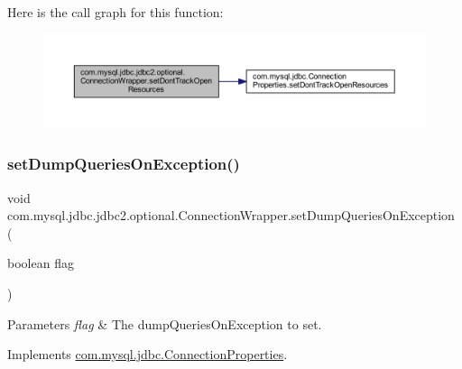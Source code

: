 Here is the call graph for this function\+:
\nopagebreak
\begin{figure}[H]
\begin{center}
\leavevmode
\includegraphics[width=350pt]{classcom_1_1mysql_1_1jdbc_1_1jdbc2_1_1optional_1_1_connection_wrapper_abae4382f9155415413562a3593b61a5d_cgraph}
\end{center}
\end{figure}
\mbox{\label{classcom_1_1mysql_1_1jdbc_1_1jdbc2_1_1optional_1_1_connection_wrapper_a0e4c6f477c15bd82e03a4376fbef7124}} 
\subsubsection{\texorpdfstring{set\+Dump\+Queries\+On\+Exception()}{setDumpQueriesOnException()}}
{\footnotesize\ttfamily void com.\+mysql.\+jdbc.\+jdbc2.\+optional.\+Connection\+Wrapper.\+set\+Dump\+Queries\+On\+Exception (\begin{DoxyParamCaption}\item[{boolean}]{flag }\end{DoxyParamCaption})}


\begin{DoxyParams}{Parameters}
{\em flag} & The dump\+Queries\+On\+Exception to set. \\
\hline
\end{DoxyParams}


Implements \mbox{\hyperlink{interfacecom_1_1mysql_1_1jdbc_1_1_connection_properties_a4bdf459325c8a9a96459959ea493f6a3}{com.\+mysql.\+jdbc.\+Connection\+Properties}}.

